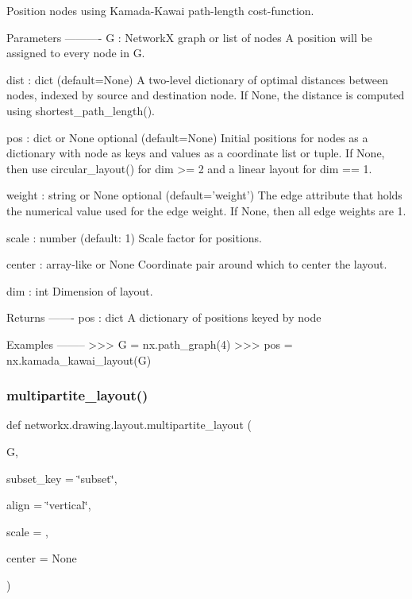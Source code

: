 \begin{DoxyVerb}Position nodes using Kamada-Kawai path-length cost-function.

Parameters
----------
G : NetworkX graph or list of nodes
    A position will be assigned to every node in G.

dist : dict (default=None)
    A two-level dictionary of optimal distances between nodes,
    indexed by source and destination node.
    If None, the distance is computed using shortest_path_length().

pos : dict or None  optional (default=None)
    Initial positions for nodes as a dictionary with node as keys
    and values as a coordinate list or tuple.  If None, then use
    circular_layout() for dim >= 2 and a linear layout for dim == 1.

weight : string or None   optional (default='weight')
    The edge attribute that holds the numerical value used for
    the edge weight.  If None, then all edge weights are 1.

scale : number (default: 1)
    Scale factor for positions.

center : array-like or None
    Coordinate pair around which to center the layout.

dim : int
    Dimension of layout.

Returns
-------
pos : dict
    A dictionary of positions keyed by node

Examples
--------
>>> G = nx.path_graph(4)
>>> pos = nx.kamada_kawai_layout(G)
\end{DoxyVerb}
 \mbox{\label{namespacenetworkx_1_1drawing_1_1layout_a3d5aad61461478c634351e735fdb815b}} 
\subsubsection{\texorpdfstring{multipartite\+\_\+layout()}{multipartite\_layout()}}
{\footnotesize\ttfamily def networkx.\+drawing.\+layout.\+multipartite\+\_\+layout (\begin{DoxyParamCaption}\item[{}]{G,  }\item[{}]{subset\+\_\+key = {\ttfamily \char`\"{}subset\char`\"{}},  }\item[{}]{align = {\ttfamily \char`\"{}vertical\char`\"{}},  }\item[{}]{scale = {},  }\item[{}]{center = {\ttfamily None} }\end{DoxyParamCaption})}

